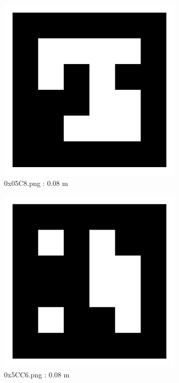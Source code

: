 \documentclass[11pt,a4,BCOR=0cm]{scrartcl}
\begin{document}
\begin{figure}
  \centering
    \includegraphics[width=8.955cm]{0x05C8.pdf}
    \caption{0x05C8.png : 0.08 m}
    \label{fig:0x05C8.pdf}
  
\end{figure} 

\begin{figure}
  \centering
    \includegraphics[width=8.955cm]{0x5CC6.pdf}
    \caption{0x5CC6.png : 0.08 m}
    \label{fig:0x5CC6.pdf}
  
\end{figure} 

\clearpage
\end{document}
